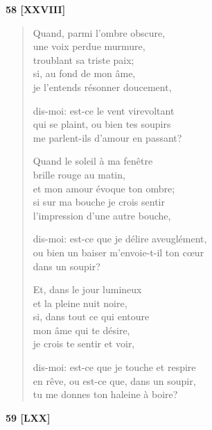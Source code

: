 \pagebreak

\begin{center}
  \textbf{58 [XXVIII]}
\end{center}

\begin{verse}
  Quand, parmi l'ombre obscure, \\
  une voix perdue murmure, \\
  troublant sa triste paix; \\
  si, au fond de mon âme, \\
  je l'entends résonner doucement,

  dis-moi: est-ce le vent virevoltant \\
  qui se plaint, ou bien tes soupirs \\
  me parlent-ils d'amour en passant?

  Quand le soleil à ma fenêtre \\
  brille rouge au matin, \\
  et mon amour évoque ton ombre; \\
  si sur ma bouche je crois sentir \\
  l'impression d'une autre bouche,

  dis-moi: est-ce que je délire aveuglément, \\
  ou bien un baiser m'envoie-t-il ton cœur \\
  dans un soupir?

  Et, dans le jour lumineux \\
  et la pleine nuit noire, \\
  si, dans tout ce qui entoure \\
  mon âme qui te désire, \\
  je crois te sentir et voir,

  dis-moi: est-ce que je touche et respire \\
  en rêve, ou est-ce que, dans un soupir, \\
  tu me donnes ton haleine à boire?
\end{verse}


\begin{center}
  \textbf{59 [LXX]}
\end{center}

